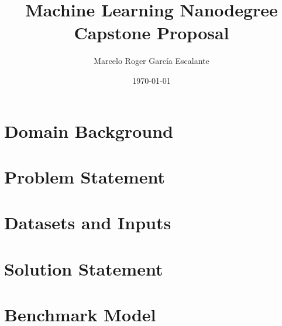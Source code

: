 \documentclass[a4paper]{article}
\title{Machine Learning Nanodegree  \linebreak Capstone Proposal}
\author{Marcelo Roger García Escalante}
\date{\today}
\begin{document}
\maketitle

\section{Domain Background}



\section{Problem Statement}
\label{sec:problem-statement}


\section{Datasets and Inputs}


\section{Solution Statement}


\section{Benchmark Model}

\end{document}
